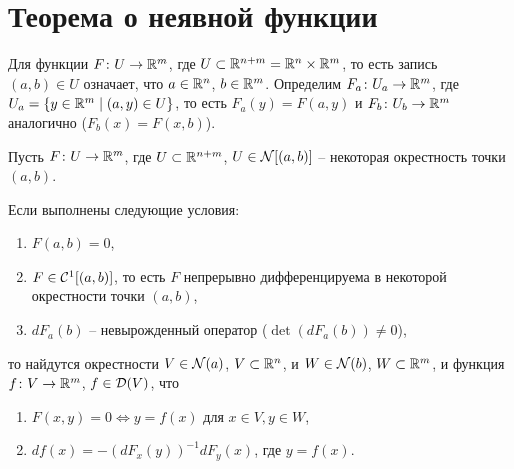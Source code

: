 	\section{Теорема о неявной функции}
	Для функции $F\colon U \to \mathbb{R}^m$, где $U\subset \mathbb{R}^{n+m} = \mathbb{R}^n \times \mathbb{R}^m$, то есть запись $(a, b) \in U$ означает, что $a\in \mathbb{R}^n$, $b \in \mathbb{R}^m$.
	Определим $F_a\colon U_a \to \mathbb{R}^m$, где $U_a = \{y\in\mathbb{R}^m\mid (a,y)\in U\}$, то есть $F_a(y) = F(a,y)$ и $F_b\colon U_b \to \mathbb{R}^m$ аналогично ($F_b(x) = F(x, b)$).
	
	\begin{theorem}
		Пусть $F\colon U \to \mathbb{R}^m$, где $U\subset \mathbb{R}^{n+m}$, $U\in \mathcal{N}[(a,b)]$ -- некоторая окрестность точки $(a,b)$. 
		
		Если выполнены следующие условия:
		\begin{enumerate}
			\item $F(a,b)=0$,
			\item \label{cond1} $F\in \mathcal{C}^1 [(a,b)]$, то есть $F$ непрерывно дифференцируема в некоторой окрестности точки $(a,b)$,
			\item $dF_a(b)$ -- невырожденный оператор ($\det(dF_a(b))\not= 0$),
		\end{enumerate}
		то найдутся окрестности $V \in \mathcal{N}(a)$, $V \subset \mathbb{R}^n$, и $W \in \mathcal{N}(b)$, $W \subset \mathbb{R}^m$, и функция $f\colon V \to\mathbb{R}^m$, $f\in\mathcal{D}(V)$, что
		\begin{enumerate}
			\item $F(x,y) = 0 \Longleftrightarrow y=f(x)$ для $x\in V, y \in W$,
			\item $df(x) = - (dF_x(y))^{-1}dF_y(x)$, где $y = f(x)$.
		\end{enumerate}
	\end{theorem}	
